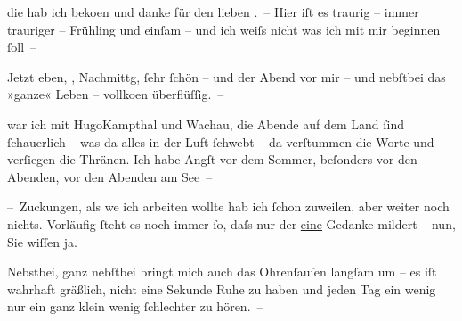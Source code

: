 \pstart
           die \label{K_L00921-1v}\label{K_L00921-1} hab ich beko{\geminationm}en und danke für den
               lieben \label{K_L00921-2v}\label{K_L00921-2}. – Hier iſt es traurig – immer trauriger – Frühling und einſam – und
               ich weiſs nicht was ich mit mir beginnen{ }ſoll –\pend
           
\pstart
           Jetzt eben, \label{K_L00921-3v}\label{K_L00921-3}, Nachmittg,{ }ſehr{ }ſchön
               – und der Abend vor mir – und nebſtbei das »ganze« Leben – vollko{\geminationm}en {\pb}überflüſſig. –\pend
           
\pstart
           \label{K_L00921-4v}\label{K_L00921-4} war ich mit HugoKampthal und Wachau, die Abende auf dem Land{ }ſind{ }ſchauerlich – was da alles in der Luft{ }ſchwebt – da verſtummen die Worte und verſiegen die Thränen. Ich habe Angſt vor dem
               Sommer, beſonders vor den Abenden, vor den Abenden am See –\pend
           
\pstart
           – Zuckungen, als we{\geminationn} ich {\pb}arbeiten wollte hab ich{ }ſchon zuweilen, aber weiter noch nichts. Vorläufig{ }ſteht es
               noch immer{ }ſo, daſs nur der \uline{eine} Gedanke mildert –
               nun, Sie wiſſen ja.\pend
           
\pstart
           Nebstbei, ganz nebſtbei bringt mich auch das Ohrenſauſen langſam um – es iſt wahrhaft
               gräßlich, nicht eine Sekunde Ruhe zu haben und jeden Tag ein wenig nur {\pb}ein ganz klein wenig{ }ſchlechter zu hören. –\pend
           
